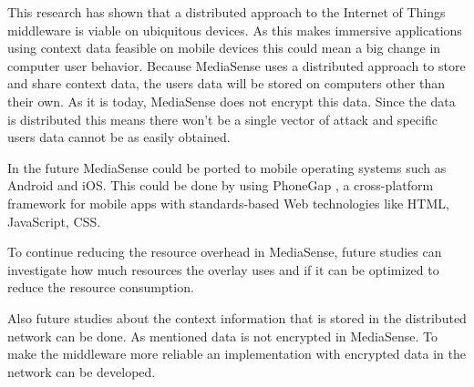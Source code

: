 This research has shown that a distributed approach to the Internet of Things middleware is viable on ubiquitous devices. As this makes immersive applications using context data feasible on mobile devices this could mean a big change in computer user behavior.
Because MediaSense uses a distributed approach to store and share context data, the users data will be stored on computers other than their own. As it is today, MediaSense does not encrypt this data. Since the data is distributed this means there won't be a single vector of attack and specific users data cannot be as easily obtained. 

In the future MediaSense could be ported to mobile operating systems such as Android and iOS. This could be done by using PhoneGap \cite{phonegap}, a cross-platform framework for mobile apps with standards-based Web technologies like HTML, JavaScript, CSS. 

To continue reducing the resource overhead in MediaSense, future studies can investigate how much resources the overlay uses and if it can be optimized to reduce the resource consumption. 

Also future studies about the context information that is stored in the distributed network can be done. As mentioned data is not encrypted in MediaSense. To make the middleware more reliable an implementation with encrypted data in the network can be developed.